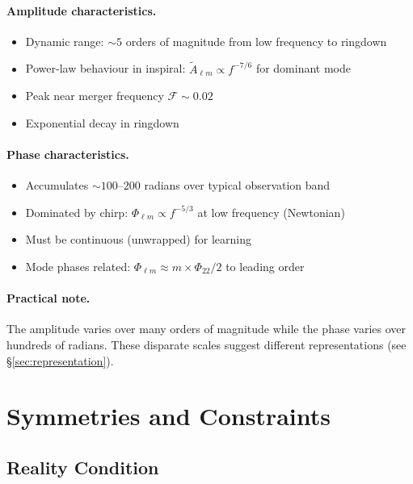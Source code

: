 \documentclass[11pt,a4paper]{article}
\newcommand{\Atlm}{\tilde{A}_{\ell m}}
\newcommand{\Philm}{\Phi_{\ell m}}
\newcommand{\Mf}{\mathcal{F}}
\begin{document}
\paragraph{Amplitude characteristics.}
\begin{itemize}
    \item Dynamic range: $\sim 5$ orders of magnitude from low frequency to ringdown
    \item Power-law behaviour in inspiral: $\Atlm \propto f^{-7/6}$ for dominant mode
    \item Peak near merger frequency $\Mf \sim 0.02$
    \item Exponential decay in ringdown
\end{itemize}

\paragraph{Phase characteristics.}
\begin{itemize}
    \item Accumulates $\sim 100$--$200$ radians over typical observation band
    \item Dominated by chirp: $\Philm \propto f^{-5/3}$ at low frequency (Newtonian)
    \item Must be continuous (unwrapped) for learning
    \item Mode phases related: $\Phi_{\ell m} \approx m \times \Phi_{22}/2$ to leading order
\end{itemize}

\paragraph{Practical note.} The amplitude varies over many orders of magnitude while the phase varies over hundreds of radians. These disparate scales suggest different representations (see \S\ref{sec:representation}).

\section{Symmetries and Constraints}
\label{sec:symmetries}

\subsection{Reality Condition}
\end{document}
